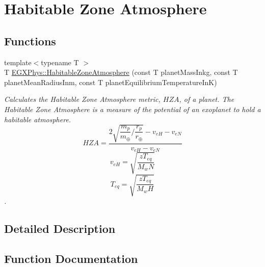 \hypertarget{group___e_g_x_phys-_astrophysics-_habitable_zone_atmosphere}{}\section{Habitable Zone Atmosphere}
\label{group___e_g_x_phys-_astrophysics-_habitable_zone_atmosphere}
\subsection*{Functions}
\begin{DoxyCompactItemize}
\item 
{\footnotesize template$<$typename T $>$ }\\T \mbox{\hyperlink{group___e_g_x_phys-_astrophysics-_habitable_zone_atmosphere_ga8cbf49b9a19cfe7a430f1528bb603950}{E\+G\+X\+Phys\+::\+Habitable\+Zone\+Atmosphere}} (const T planet\+Mass\+Inkg, const T planet\+Mean\+Radius\+Inm, const T planet\+Equilibrium\+Temperature\+InK)
\begin{DoxyCompactList}\small\item\em Calculates the Habitable Zone Atmosphere metric, $HZA$, of a planet. The Habitable Zone Atmosphere is a measure of the potential of an exoplanet to hold a habitable atmosphere. \[ HZA= \dfrac{ 2\sqrt{ \dfrac{m_p}{m_{\oplus}} / \dfrac{r_p}{r_{\oplus}} } -v_{eH} - v_{eN} }{v_{eH} - v_{eN}} \] \[ v_{eH}=\sqrt{ \dfrac{z T_{eq}}{ M_wN } } \] \[ T_{eq}=\sqrt{ \dfrac{z T_{eq}}{ M_wH } } \]. \end{DoxyCompactList}\end{DoxyCompactItemize}


\subsection{Detailed Description}


\subsection{Function Documentation}
\mbox{\label{group___e_g_x_phys-_astrophysics-_habitable_zone_atmosphere_ga8cbf49b9a19cfe7a430f1528bb603950}} 
